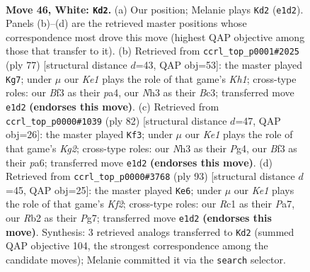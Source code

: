 \documentclass[11pt]{article}
\begin{document}
\clearpage

\begin{figure}[p]\centering
\begin{subfigure}{0.46\textwidth}\centering
\resizebox{\linewidth}{!}{%
\newchessgame
\chessboard[
  setfen={3r2k1/5p1p/b7/pr6/3p2P1/1P3B1N/1R5P/2R1K3 w - - 6 46},
  showmover=false,
  pgfstyle=straightmove, color=movearrow, markmove={e1-d2}
]}
\caption{}
\end{subfigure}\hfill
\begin{subfigure}{0.46\textwidth}\centering
\resizebox{\linewidth}{!}{%
\newchessgame
\chessboard[
  setfen={5r1k/3R1p2/7r/4pR1P/Pp6/2b5/2B2P2/5K2 b - - 1 39},
  showmover=false,
  pgfstyle=straightmove, color=movearrow, markmove={h8-g7}
]}
\caption{}
\end{subfigure}
\\[4pt]
\begin{subfigure}{0.46\textwidth}\centering
\resizebox{\linewidth}{!}{%
\newchessgame
\chessboard[
  setfen={8/1r1r1pk1/p2P3p/8/5RP1/7P/3R2K1/8 w - - 0 42},
  showmover=false,
  pgfstyle=straightmove, color=movearrow, markmove={g2-f3}
]}
\caption{}
\end{subfigure}\hfill
\begin{subfigure}{0.46\textwidth}\centering
\resizebox{\linewidth}{!}{%
\newchessgame
\chessboard[
  setfen={8/p4kp1/3r4/2rp3p/P2R1P2/6P1/3R2KP/8 b - - 0 47},
  showmover=false,
  pgfstyle=straightmove, color=movearrow, markmove={f7-e6}
]}
\caption{}
\end{subfigure}
\caption{\textbf{Move 46, White: \texttt{Kd2}.} (a) Our position; Melanie plays \texttt{Kd2} (\texttt{e1d2}). Panels (b)--(d) are the retrieved master positions whose correspondence most drove this move (highest QAP objective among those that transfer to it). (b) Retrieved from \texttt{ccrl\_top\_p0001\#2025} (ply 77) [structural distance $d$=43, QAP obj=53]: the master played \texttt{Kg7}; under $\mu$ our \emph{Ke1} plays the role of that game's \emph{Kh1}; cross-type roles: our \emph{B}f3 as their \emph{p}a4, our \emph{N}h3 as their \emph{B}c3; transferred move \texttt{e1d2} \textbf{(endorses this move)}. (c) Retrieved from \texttt{ccrl\_top\_p0000\#1039} (ply 82) [structural distance $d$=47, QAP obj=26]: the master played \texttt{Kf3}; under $\mu$ our \emph{Ke1} plays the role of that game's \emph{Kg2}; cross-type roles: our \emph{N}h3 as their \emph{P}g4, our \emph{B}f3 as their \emph{p}a6; transferred move \texttt{e1d2} \textbf{(endorses this move)}. (d) Retrieved from \texttt{ccrl\_top\_p0000\#3768} (ply 93) [structural distance $d$=45, QAP obj=25]: the master played \texttt{Ke6}; under $\mu$ our \emph{Ke1} plays the role of that game's \emph{Kf2}; cross-type roles: our \emph{R}c1 as their \emph{P}a7, our \emph{R}b2 as their \emph{P}g7; transferred move \texttt{e1d2} \textbf{(endorses this move)}. Synthesis: 3 retrieved analogs transferred to \texttt{Kd2} (summed QAP objective 104, the strongest correspondence among the candidate moves); Melanie committed it via the \texttt{search} selector.}
\label{fig:thought-m90}
\end{figure}
\end{document}
